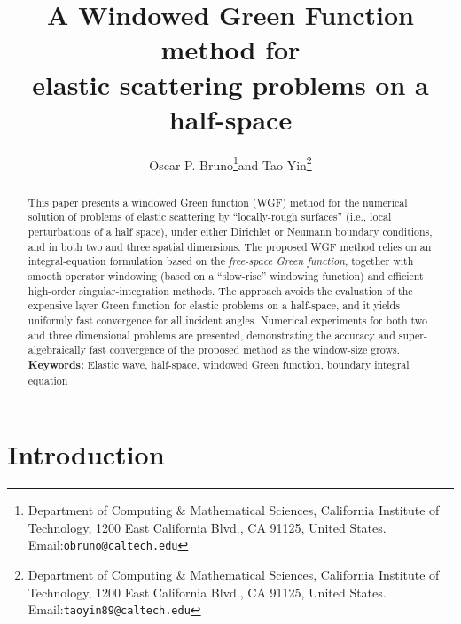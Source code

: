 \documentclass[10pt]{article}
\numberwithin{equation}{section}
\begin{document}
\renewcommand{\theequation}{\arabic{section}.\arabic{equation}}
\begin{titlepage}
  \title{A Windowed Green Function method for  \\
    elastic scattering problems on a half-space}

\author{Oscar P. Bruno\thanks{Department of Computing \& Mathematical Sciences, California Institute of Technology, 1200 East California Blvd., CA 91125, United States. Email:{\tt obruno@caltech.edu}}\;\;and
Tao Yin\thanks{Department of Computing \& Mathematical Sciences, California Institute of Technology, 1200 East California Blvd., CA 91125, United States. Email:{\tt taoyin89@caltech.edu}}}
\end{titlepage}
\maketitle

\begin{abstract}
  This paper presents a windowed Green function (WGF) method for the
  numerical solution of problems of elastic scattering by
  ``locally-rough surfaces'' (i.e., local perturbations of a half
  space), under either Dirichlet or Neumann boundary conditions, and
  in both two and three spatial dimensions. The proposed WGF method
  relies on an integral-equation formulation based on the {\em
    free-space Green function}, together with smooth operator
  windowing (based on a ``slow-rise'' windowing function) and
  efficient high-order singular-integration methods. The approach
  avoids the evaluation of the expensive layer Green function for
  elastic problems on a half-space, and it yields uniformly fast
  convergence for all incident angles. Numerical experiments for both
  two and three dimensional problems are presented, demonstrating the
  accuracy and super-algebraically fast convergence of the proposed
  method as the window-size grows.  {\bf Keywords:} Elastic wave,
  half-space, windowed Green function, boundary integral equation
\end{abstract}


\section{Introduction}
\label{sec:1}
\end{document}
